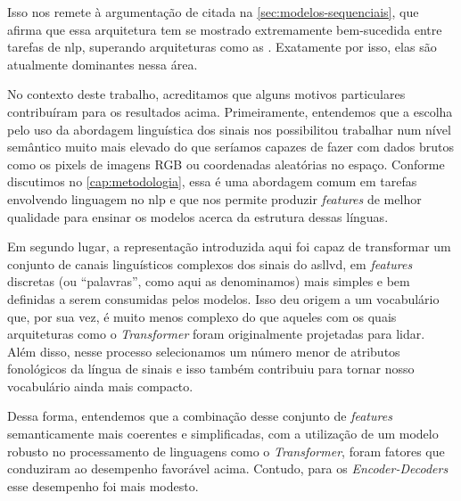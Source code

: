Isso nos remete à argumentação de  citada na \autoref{sec:modelos-sequenciais}, que afirma que essa arquitetura tem se mostrado extremamente bem-sucedida entre tarefas de \acrfull{nlp}, superando arquiteturas como as . Exatamente por isso, elas são atualmente dominantes nessa área.

No contexto deste trabalho, acreditamos que alguns motivos particulares contribuíram para os resultados acima.
Primeiramente, entendemos que a escolha pelo uso da abordagem linguística dos sinais nos possibilitou trabalhar num nível semântico muito mais elevado do que seríamos capazes de fazer com dados brutos como os pixels de imagens RGB ou coordenadas aleatórias no espaço. Conforme discutimos no \autoref{cap:metodologia}, essa é uma abordagem comum em tarefas envolvendo linguagem no \acrshort{nlp} e que nos permite produzir \textit{features} de melhor qualidade para ensinar os modelos acerca da estrutura dessas línguas.

Em segundo lugar, a representação introduzida aqui foi capaz de transformar um conjunto de canais linguísticos complexos dos sinais do \acrshort{asllvd}, em \textit{features} discretas (ou ``palavras'', como aqui as denominamos) mais simples e bem definidas a serem consumidas pelos modelos.
Isso deu origem a um vocabulário que, por sua vez, é muito menos complexo do que aqueles com os quais arquiteturas como o \textit{Transformer} foram originalmente projetadas para lidar. Além disso, nesse processo selecionamos um número menor de atributos fonológicos da língua de sinais e isso também contribuiu para tornar nosso vocabulário ainda mais compacto.

Dessa forma, entendemos que a combinação desse conjunto de \textit{features} semanticamente mais coerentes e simplificadas, com a utilização de um modelo robusto no processamento de linguagens como o \textit{Transformer}, foram fatores que conduziram ao desempenho favorável acima.
Contudo, para os \textit{Encoder-Decoders} esse desempenho foi mais modesto.












